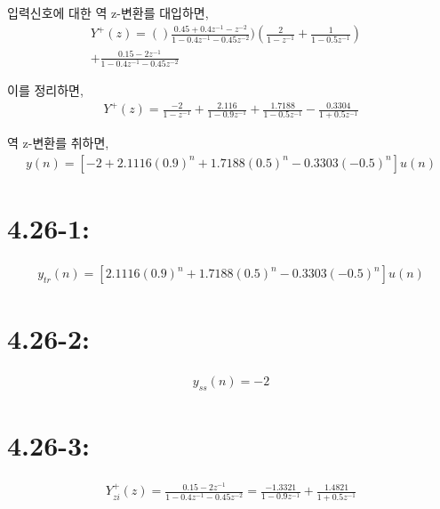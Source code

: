 \documentclass[11pt
  , a4paper
  , article
  , oneside
]{memoir}
\begin{document}
입력신호에 대한 역 z-변환를 대입하면,
\begin {equation}
\begin {split}
Y^+(z)= ()\frac{0.45+0.4z^{-1}-z^{-2}}{1-0.4z^{-1}-0.45z^{-2}})(\frac{2}{1-z^{-1}}+\frac{1}{1-0.5z^{-1}}) &\\
+ \frac{0.15-2z^{-1}}{1-0.4z^{-1}-0.45z^{-2}}
\nonumber
\end{split}
\end {equation}

이를 정리하면,
\begin {equation}
\begin {split}
Y^+(z)= \frac{-2}{1-z^{-1}}+\frac{2.116}{1-0.9z^{-1}}+\frac{1.7188}{1-0.5z^{-1}}-\frac{0.3304}{1+0.5z^{-1}}
\nonumber
\end{split}
\end {equation}

역 z-변환를 취하면,
\begin {equation}
\begin {split}
y(n)= [-2 + 2.1116(0.9)^n + 1.7188(0.5)^n - 0.3303(-0.5)^n]u(n)
\nonumber
\end{split}
\end {equation}

\section{4.26-1:}
\begin {equation}
\begin {split}
y_{tr}(n)= [2.1116(0.9)^n + 1.7188(0.5)^n - 0.3303(-0.5)^n]u(n)
\nonumber
\end{split}
\end {equation}

\section{4.26-2:}
\begin {equation}
\begin {split}
y_{ss}(n)= -2
\nonumber
\end{split}
\end {equation}

\section{4.26-3:}
\begin {equation}
\begin {split}
Y^+_{zi}(z)=\frac{0.15 -2z^{-1}}{1-0.4z^{-1}-0.45z^{-2}} = \frac{-1.3321}{1-0.9z^{-1}} + \frac{1.4821}{1+0.5z^{-1}} 
\nonumber
\end{split}
\end {equation}
\end{document}

